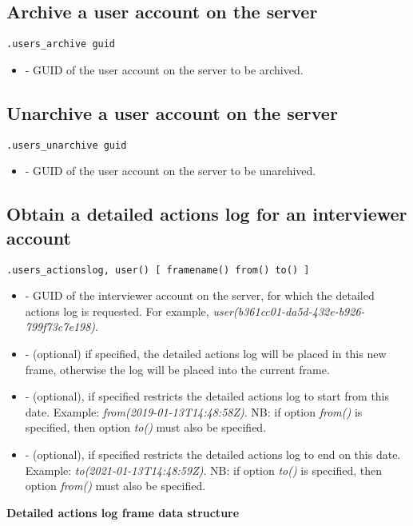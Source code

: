 \subsection{Archive a user account on the server}
\begin{lstlisting}[style=CommandLineStyle]
.users_archive guid
\end{lstlisting}

\paramsheader
\begin{itemize}
      \item {} - GUID of the user account on the server to be archived.
\end{itemize}


\subsection{Unarchive a user account on the server}
\begin{lstlisting}[style=CommandLineStyle]
.users_unarchive guid
\end{lstlisting}

\paramsheader
\begin{itemize}
      \item {} - GUID of the user account on the server to be unarchived.
\end{itemize}


\subsection{Obtain a detailed actions log for an interviewer account}
\begin{lstlisting}[style=CommandLineStyle]
.users_actionslog, user() [ framename() from() to() ]
\end{lstlisting}

\optsheader
\begin{itemize}
      \item {} - GUID of the interviewer account on the server, for which the detailed actions log is requested. For example, \textit{user(b361cc01-da5d-432e-b926-799f73c7e198)}.
      \item {} - (optional) if specified, the detailed actions log will be placed in this new frame, otherwise the log will be placed into the current frame.
      \item {} - (optional), if specified restricts the detailed actions log to start from this date. Example: \textit{from(2019-01-13T14:48:58Z)}. NB: if option \textit{from()} is specified, then option \textit{to()} must also be specified.
      \item {} - (optional), if specified restricts the detailed actions log to end on this date. Example: \textit{to(2021-01-13T14:48:59Z)}. NB: if option \textit{to()} is specified, then option \textit{from()} must also be specified.
\end{itemize}

\textbf{Detailed actions log frame data structure}

\begin{compactitem}
\end{compactitem}
